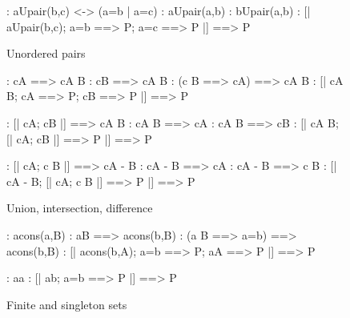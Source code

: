 
\begin{figure}
\begin{alltt*}\isastyleminor
{}:   a\isasymin{}Upair(b,c) <-> (a=b | a=c)
:   a\isasymin{}Upair(a,b)
:   b\isasymin{}Upair(a,b)
:    [| a\isasymin{}Upair(b,c);  a=b ==> P;  a=c ==> P |] ==> P
\end{alltt*}
\caption{Unordered pairs} \label{zf-upair1}
\end{figure}


\begin{figure}
\begin{alltt*}\isastyleminor
{}:      c\isasymin{}A ==> c\isasymin{}A \isasymunion B
:      c\isasymin{}B ==> c\isasymin{}A \isasymunion B
:      (c \isasymnotin B ==> c\isasymin{}A) ==> c\isasymin{}A \isasymunion B
:       [| c\isasymin{}A \isasymunion B;  c\isasymin{}A ==> P;  c\isasymin{}B ==> P |] ==> P

:      [| c\isasymin{}A;  c\isasymin{}B |] ==> c\isasymin{}A \isasyminter B
:     c\isasymin{}A \isasyminter B ==> c\isasymin{}A
:     c\isasymin{}A \isasyminter B ==> c\isasymin{}B
:      [| c\isasymin{}A \isasyminter B;  [| c\isasymin{}A; c\isasymin{}B |] ==> P |] ==> P

:     [| c\isasymin{}A;  c \isasymnotin B |] ==> c\isasymin{}A - B
:    c\isasymin{}A - B ==> c\isasymin{}A
:    c\isasymin{}A - B ==> c  \isasymnotin  B
:     [| c\isasymin{}A - B;  [| c\isasymin{}A; c \isasymnotin B |] ==> P |] ==> P
\end{alltt*}
\caption{Union, intersection, difference} \label{zf-Un}
\end{figure}


\begin{figure}
\begin{alltt*}\isastyleminor
{}:    a\isasymin{}cons(a,B)
:    a\isasymin{}B ==> a\isasymin{}cons(b,B)
:    (a \isasymnotin B ==> a=b) ==> a\isasymin{}cons(b,B)
:     [| a\isasymin{}cons(b,A);  a=b ==> P;  a\isasymin{}A ==> P |] ==> P

:  a\isasymin{}{\ttlbrace}a{\ttrbrace}
:  [| a\isasymin{}{\ttlbrace}b{\ttrbrace}; a=b ==> P |] ==> P
\end{alltt*}
\caption{Finite and singleton sets} \label{zf-upair2}
\end{figure}


